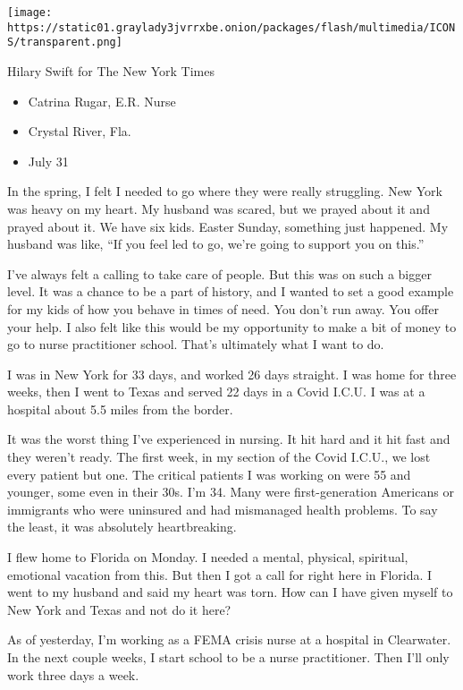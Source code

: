 \texttt{[image: https://static01.graylady3jvrrxbe.onion/packages/flash/multimedia/ICONS/transparent.png]}

Hilary Swift for The New York Times

\begin{itemize}
\tightlist
\item
  Catrina Rugar, E.R. Nurse
\item
  Crystal River, Fla.
\item
  July 31
\end{itemize}

In the spring, I felt I needed to go where they were really struggling.
New York was heavy on my heart. My husband was scared, but we prayed
about it and prayed about it. We have six kids. Easter Sunday, something
just happened. My husband was like, ``If you feel led to go, we're going
to support you on this.''

I've always felt a calling to take care of people. But this was on such
a bigger level. It was a chance to be a part of history, and I wanted to
set a good example for my kids of how you behave in times of need. You
don't run away. You offer your help. I also felt like this would be my
opportunity to make a bit of money to go to nurse practitioner school.
That's ultimately what I want to do.

I was in New York for 33 days, and worked 26 days straight. I was home
for three weeks, then I went to Texas and served 22 days in a Covid
I.C.U. I was at a hospital about 5.5 miles from the border.

It was the worst thing I've experienced in nursing. It hit hard and it
hit fast and they weren't ready. The first week, in my section of the
Covid I.C.U., we lost every patient but one. The critical patients I was
working on were 55 and younger, some even in their 30s. I'm 34. Many
were first-generation Americans or immigrants who were uninsured and had
mismanaged health problems. To say the least, it was absolutely
heartbreaking.

I flew home to Florida on Monday. I needed a mental, physical,
spiritual, emotional vacation from this. But then I got a call for right
here in Florida. I went to my husband and said my heart was torn. How
can I have given myself to New York and Texas and not do it here?

As of yesterday, I'm working as a FEMA crisis nurse at a hospital in
Clearwater. In the next couple weeks, I start school to be a nurse
practitioner. Then I'll only work three days a week.


